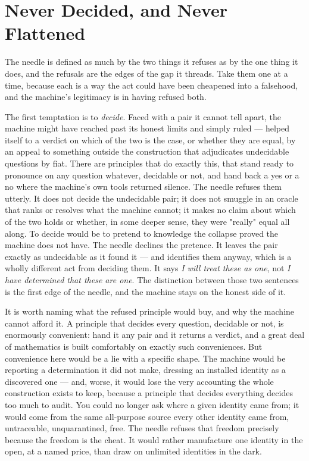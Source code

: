 \section{Never Decided, and Never Flattened}

The needle is defined as much by the two things it refuses as by the one thing it does, and the refusals are the
edges of the gap it threads. Take them one at a time, because each is a way the act could have been cheapened into
a falsehood, and the machine's legitimacy is in having refused both.

The first temptation is to \emph{decide}. Faced with a pair it cannot tell apart, the machine might have reached
past its honest limits and simply ruled --- helped itself to a verdict on which of the two is the case, or whether
they are equal, by an appeal to something outside the construction that adjudicates undecidable questions by fiat.
There are principles that do exactly this, that stand ready to pronounce on any question whatever, decidable or
not, and hand back a yes or a no where the machine's own tools returned silence. The needle refuses them utterly.
It does not decide the undecidable pair; it does not smuggle in an oracle that ranks or resolves what the machine
cannot; it makes no claim about which of the two holds or whether, in some deeper sense, they were "really" equal
all along. To decide would be to pretend to knowledge the collapse proved the machine does not have. The needle
declines the pretence. It leaves the pair exactly as undecidable as it found it --- and identifies them anyway,
which is a wholly different act from deciding them. It says \emph{I will treat these as one}, not \emph{I have
determined that these are one}. The distinction between those two sentences is the first edge of the needle, and
the machine stays on the honest side of it.

It is worth naming what the refused principle would buy, and why the machine cannot afford it. A principle that
decides every question, decidable or not, is enormously convenient: hand it any pair and it returns a verdict,
and a great deal of mathematics is built comfortably on exactly such conveniences. But convenience here would be
a lie with a specific shape. The machine would be reporting a determination it did not make, dressing an
installed identity as a discovered one --- and, worse, it would lose the very accounting the whole construction
exists to keep, because a principle that decides everything decides too much to audit. You could no longer ask
where a given identity came from; it would come from the same all-purpose source every other identity came from,
untraceable, unquarantined, free. The needle refuses that freedom precisely because the freedom is the cheat. It
would rather manufacture one identity in the open, at a named price, than draw on unlimited identities in the
dark.


